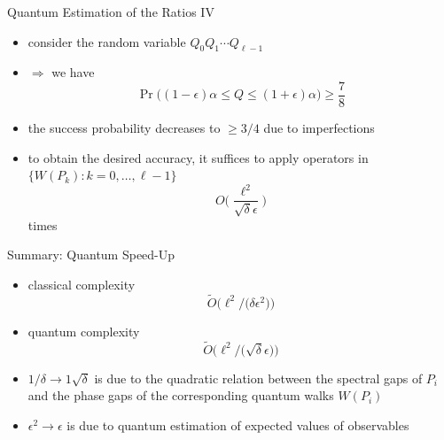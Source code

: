 \documentclass[slideColor]{prosper}
\renewcommand{\>}{\rangle}
\newcommand{\<}{\langle}
\begin{document}
\begin{slide}{Quantum Estimation of the Ratios IV}
\begin{itemize}
\item consider the random variable $Q_0 Q_1 \cdots Q_{\ell-1}$

\item $\Rightarrow$ we have
\[
\Pr\Big( (1-\epsilon)\alpha \le Q \le (1+\epsilon)\alpha \Big) \ge \frac{7}{8} 
\]

\item the success probability decreases to $\ge 3/4$ due to imperfections

\item to obtain the desired accuracy, it suffices to apply operators in $\{W(P_k) : k=0,\ldots,\ell-1\}$
\[
O\Big(
\frac{\ell^2}{\sqrt{\delta}\epsilon}
\Big)
\]
times
\end{itemize}
\end{slide}


\begin{slide}{Summary: Quantum Speed-Up}
\begin{itemize}
\item classical complexity
\[
\tilde{O}\Big(
\ell^2 /\big(\delta \epsilon^2\big) 
\Big)
\]

\item quantum complexity
\[
\tilde{O}\Big(
\ell^2/\big(\sqrt{\delta} \epsilon\big)
\Big)
\]

\item $1/\delta \rightarrow 1\sqrt{\delta}$ is due to the quadratic relation between the spectral gaps of $P_i$ and the phase gaps of the corresponding quantum walks $W(P_i)$ 

\medskip
\item $\epsilon^2 \rightarrow \epsilon$ is due to quantum estimation of expected values of observables
\end{itemize}
\end{slide}

\end{document}
